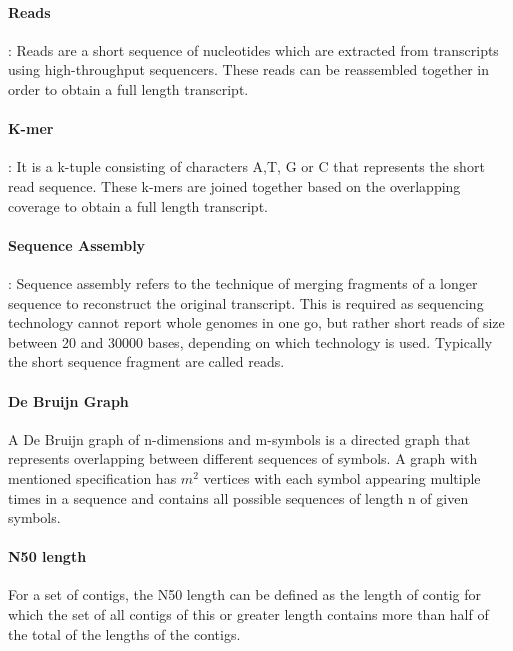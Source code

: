 \label{key}\documentclass[plainarticle, english ,zihtitle,final,hyperref,utf8]{zihpub}
\begin{document}
\paragraph{Reads}: 
Reads are a short sequence of nucleotides which are extracted from transcripts using high-throughput sequencers. These reads can be reassembled together in order to obtain a full length transcript.
\paragraph{K-mer}: It is a k-tuple consisting of characters A,T, G or C that represents the short read sequence. These k-mers are joined together based on the overlapping coverage to obtain a full length transcript.
\paragraph{Sequence Assembly}: Sequence assembly refers to the technique of merging fragments of a longer sequence to reconstruct the original transcript. This is required as sequencing technology cannot report whole genomes in one go, but rather short reads of size between 20 and 30000 bases, depending on which technology is used. Typically the short sequence fragment are called reads.
\paragraph{De Bruijn Graph} A De Bruijn graph of n-dimensions and m-symbols is a directed graph that represents overlapping between different sequences of symbols. A graph with mentioned specification has $m^{2}$ vertices with each symbol appearing multiple times in a sequence and contains all possible sequences of length n of given symbols.
\paragraph{N50 length} For a set of contigs, the N50 length can be defined as the length of contig for which the set of all contigs of this or greater length contains more than half of the total of the lengths of the contigs.
\end{document}
